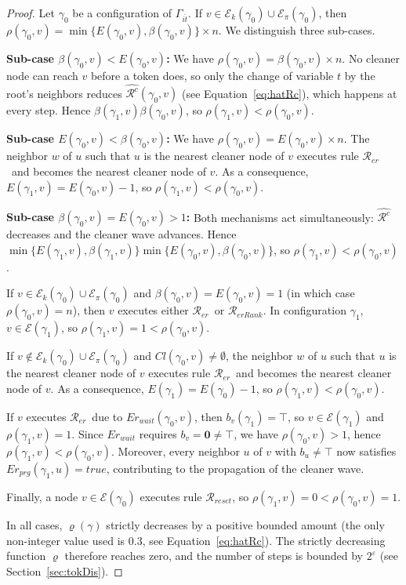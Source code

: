 \documentclass[a4paper, 12pt]{article}
\newcommand{\bz}{\mathbf{0}}
\newcommand{\Rer}{$\mathscr{R}_{er}$}
\newcommand{\Rreset}{$\mathscr{R}_{reset}$}
\newcommand{\RerRank}{$\mathscr{R}_{erRank}$}
\begin{document}
\begin{proof}
Let $\gamma_0$ be a configuration of $\Gamma_{\bar{it}}$.
If $v \in \mathcal{E}_k(\gamma_0) \cup \mathcal{E}_\pi(\gamma_0)$, then
$\rho(\gamma_0, v) = \min\{E(\gamma_0,v), \beta(\gamma_0,v)\} \times n$.
We distinguish three sub-cases.

\medskip
\noindent\textbf{Sub-case $\beta(\gamma_0,v) < E(\gamma_0,v)$:}
We have $\rho(\gamma_0,v) = \beta(\gamma_0,v) \times n$.
No cleaner node can reach $v$ before a token does, so only the
change of variable $t$ by the root's neighbors reduces
$\widehat{\mathcal{R}^c}(\gamma_0, v)$ (see Equation~\ref{eq:hatRc}),
which happens at every step. Hence $\beta(\gamma_1, v) 
\beta(\gamma_0, v)$, so $\rho(\gamma_1,v) < \rho(\gamma_0,v)$.

\medskip
\noindent\textbf{Sub-case $E(\gamma_0,v) < \beta(\gamma_0,v)$:}
We have $\rho(\gamma_0,v) = E(\gamma_0,v) \times n$.
The neighbor $w$ of $u$ such that $u$ is the nearest cleaner node of
$v$ executes rule \Rer\ and becomes the nearest cleaner node of $v$.
As a consequence, $E(\gamma_1,v) = E(\gamma_0,v) - 1$, so
$\rho(\gamma_1,v) < \rho(\gamma_0,v)$.

\medskip
\noindent\textbf{Sub-case $\beta(\gamma_0,v) = E(\gamma_0,v) > 1$:}
Both mechanisms act simultaneously: $\widehat{\mathcal{R}^c}$ decreases
and the cleaner wave advances. Hence
$\min\{E(\gamma_1,v), \beta(\gamma_1,v)\} 
\min\{E(\gamma_0,v), \beta(\gamma_0,v)\}$, so
$\rho(\gamma_1,v) < \rho(\gamma_0,v)$.

If $v \in \mathcal{E}_k(\gamma_0) \cup \mathcal{E}_\pi(\gamma_0)$ and 
$\beta(\gamma_0, v) = E(\gamma_0, v) = 1$ (in which case 
$\rho(\gamma_0, v) = n$), then $v$ executes either \Rer\ or \RerRank. 
In configuration $\gamma_1$, $v \in \mathcal{E}(\gamma_1)$, so 
$\rho(\gamma_1, v) = 1 < \rho(\gamma_0, v)$.

If $v \notin \mathcal{E}_k(\gamma_0) \cup \mathcal{E}_\pi(\gamma_0)$ 
and $Cl(\gamma_0, v) \neq \emptyset$, the neighbor $w$ of $u$ such that 
$u$ is the nearest cleaner node of $v$ executes rule \Rer\ and becomes 
the nearest cleaner node of $v$. As a consequence, 
$E(\gamma_1) = E(\gamma_0) - 1$, so $\rho(\gamma_1, v) < \rho(\gamma_0, v)$.

If $v$ executes \Rer\ due to $Er_{wait}(\gamma_0, v)$, then 
$b_v(\gamma_1) = \top$, so $v \in \mathcal{E}(\gamma_1)$ and 
$\rho(\gamma_1, v) = 1$. Since $Er_{wait}$ requires $b_v = \bz \neq \top$, 
we have $\rho(\gamma_0, v) > 1$, hence 
$\rho(\gamma_1, v) < \rho(\gamma_0, v)$. Moreover, every neighbor $u$ 
of $v$ with $b_u \neq \top$ now satisfies $Er_{prg}(\gamma_1, u) = 
\mathit{true}$, contributing to the propagation of the cleaner wave.

Finally, a node $v \in \mathcal{E}(\gamma_0)$ executes rule \Rreset, 
so $\rho(\gamma_1, v) = 0 < \rho(\gamma_0, v) = 1$.

In all cases, $\varrho(\gamma)$ strictly decreases by a positive bounded 
amount (the only non-integer value used is $0.3$, see 
Equation~\ref{eq:hatRc}). The strictly decreasing function $\varrho$ 
therefore reaches zero, and the number of steps is bounded by 
$2^\varepsilon$ (see Section~\ref{sec:tokDis}).
\end{proof}
\end{document}
